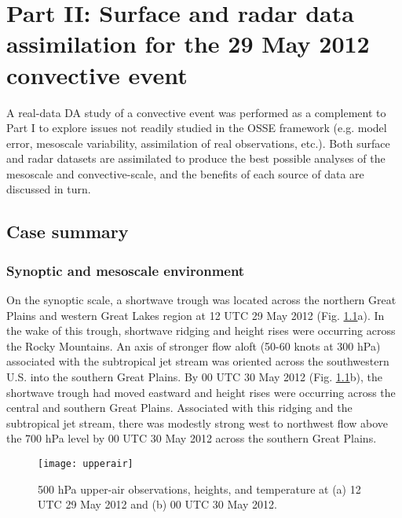 \chapter{Part II: Surface and radar data assimilation for the 29 May 2012 convective event}
\label{real_chapter}
A real-data DA study of a convective event was performed as a complement to Part I to explore issues not readily studied in the OSSE framework (e.g. model error, mesoscale variability, assimilation of real observations, etc.). Both surface and radar datasets are assimilated to produce the best possible analyses of the mesoscale and convective-scale, and the benefits of each source of data are discussed in turn.

\section{Case summary}
\subsection{Synoptic and mesoscale environment}
On the synoptic scale, a shortwave trough was located across the northern Great Plains and western Great Lakes region at 12 UTC 29 May 2012 (Fig. \ref{upper}a). In the wake of this trough, shortwave ridging and height rises were occurring across the Rocky Mountains. An axis of stronger flow aloft (50-60 knots at 300 hPa) associated with the subtropical jet stream was oriented across the southwestern U.S. into the southern Great Plains. By 00 UTC 30 May 2012 (Fig. \ref{upper}b), the shortwave trough had moved eastward and height rises were occurring across the central and southern Great Plains. Associated with this ridging and the subtropical jet stream, there was modestly strong west to northwest flow above the 700 hPa level by 00 UTC 30 May 2012 across the southern Great Plains.

\begin{figure}
\centering
\texttt{[image: upperair]}
\caption{500 hPa upper-air observations, heights, and temperature at (a) 12 UTC 29 May 2012 and (b) 00 UTC 30 May 2012.}
\label{upper}
\end{figure}

